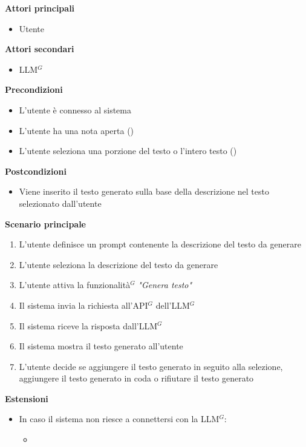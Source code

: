 \documentclass[a4paper,10pt]{article}
\begin{document}
    \textbf{Attori principali}
    \begin{itemize}
        \item Utente
    \end{itemize}
    \textbf{Attori secondari}
    \begin{itemize}
        \item LLM$^G$
    \end{itemize}
    \textbf{Precondizioni}
    \begin{itemize}
        \item L'utente è connesso al sistema
        \item L'utente ha una nota aperta ()
        \item L'utente seleziona una porzione del testo o l'intero testo ()
    \end{itemize}
    \textbf{Postcondizioni}
    \begin{itemize}
        \item Viene inserito il testo generato sulla base della descrizione nel testo selezionato dall'utente
    \end{itemize}
    \textbf{Scenario principale}
    \begin{enumerate}
        \item L'utente definisce un prompt contenente la descrizione del testo da generare
        \item L'utente seleziona la descrizione del testo da generare
        \item L'utente attiva la funzionalità$^G$ \textit{"Genera testo"}
        \item Il sistema invia la richiesta all'API$^G$ dell'LLM$^G$
        \item Il sistema riceve la risposta dall'LLM$^G$
        \item Il sistema mostra il testo generato all'utente
        \item L'utente decide se aggiungere il testo generato in seguito alla selezione, aggiungere il testo generato in coda o rifiutare il testo generato
    \end{enumerate}
    \textbf{Estensioni}
    \begin{itemize}
        \item In caso il sistema non riesce a connettersi con la LLM$^G$:
        \begin{itemize}
            \item {}
        \end{itemize}
    \end{itemize}
\end{document}
